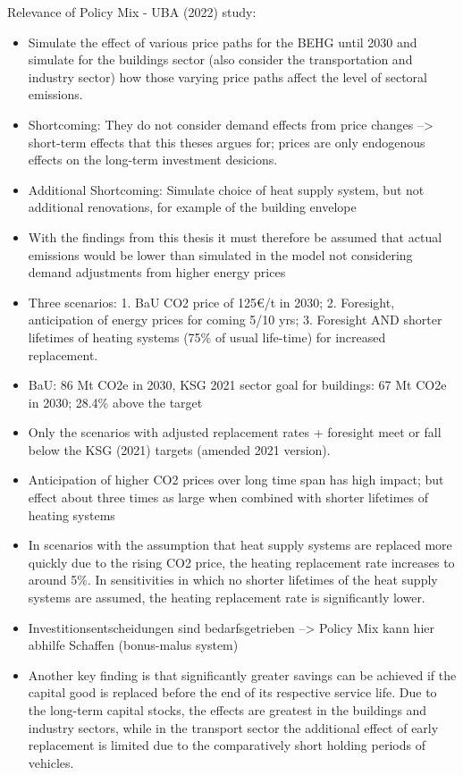 \documentclass[12pt,twoside]{reedthesis}
\begin{document}
Relevance of Policy Mix - UBA (2022) study:
\begin{itemize}
\item
  Simulate the effect of various price paths for the BEHG until 2030 and simulate for the buildings sector (also consider the transportation and industry sector) how those varying price paths affect the level of sectoral emissions.
\item
  Shortcoming: They do not consider demand effects from price changes --\textgreater{} short-term effects that this theses argues for; prices are only endogenous effects on the long-term investment desicions.
\item
  Additional Shortcoming: Simulate choice of heat supply system, but not additional renovations, for example of the building envelope
\item
  With the findings from this thesis it must therefore be assumed that actual emissions would be lower than simulated in the model not considering demand adjustments from higher energy prices
\item
  Three scenarios: 1. BaU CO2 price of 125€/t in 2030; 2. Foresight, anticipation of energy prices for coming 5/10 yrs; 3. Foresight AND shorter lifetimes of heating systems (75\% of usual life-time) for increased replacement.
\item
  BaU: 86 Mt CO2e in 2030, KSG 2021 sector goal for buildings: 67 Mt CO2e in 2030; 28.4\% above the target
\item
  Only the scenarios with adjusted replacement rates + foresight meet or fall below the KSG (2021) targets (amended 2021 version).
\item
  Anticipation of higher CO2 prices over long time span has high impact; but effect about three times as large when combined with shorter lifetimes of heating systems
\item
  In scenarios with the assumption that heat supply systems are replaced more quickly due to the rising CO2 price, the heating replacement rate increases to around 5\%. In sensitivities in which no shorter lifetimes of the heat supply systems are assumed, the heating replacement rate is significantly lower.
\item
  Investitionsentscheidungen sind bedarfsgetrieben --\textgreater{} Policy Mix kann hier abhilfe Schaffen (bonus-malus system)
\item
  Another key finding is that significantly greater savings can be achieved if the capital good is replaced before the end of its respective service life. Due to the long-term capital stocks, the effects are greatest in the buildings and industry sectors, while in the transport sector the additional effect of early replacement is limited due to the comparatively short holding periods of vehicles.

\end{itemize}
\end{document}
